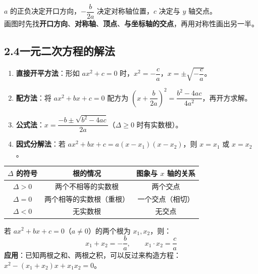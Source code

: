 \documentclass[12pt, a4paper]{ctexart}
\begin{document}
\begin{tipbox}[二次函数图象速记]
$a$ 的正负决定开口方向，$-\dfrac{b}{2a}$ 决定对称轴位置，$c$ 决定与 $y$ 轴交点。\\
画图时先找\textbf{开口方向}、\textbf{对称轴}、\textbf{顶点}、\textbf{与坐标轴的交点}，再用对称性画出另一半。
\end{tipbox}

\subsection*{2.4\quad 一元二次方程的解法}

\begin{knowledgebox}[一元二次方程 $ax^2 + bx + c = 0$ 的解法]
\begin{enumerate}[leftmargin=2em]
  \item \textbf{直接开平方法}：形如 $ax^2 + c = 0$ 时，$x^2 = -\dfrac{c}{a}$，$x = \pm\sqrt{-\dfrac{c}{a}}$。
  \item \textbf{配方法}：将 $ax^2 + bx + c = 0$ 配方为 $\left(x + \dfrac{b}{2a}\right)^2 = \dfrac{b^2 - 4ac}{4a^2}$，再开方求解。
  \item \textbf{公式法}：$x = \dfrac{-b \pm \sqrt{b^2 - 4ac}}{2a}$（$\Delta \geq 0$ 时有实数根）。
  \item \textbf{因式分解法}：若 $ax^2 + bx + c = a(x - x_1)(x - x_2)$，则 $x = x_1$ 或 $x = x_2$。
\end{enumerate}
\end{knowledgebox}

\begin{knowledgebox}[判别式 $\Delta = b^2 - 4ac$ 的作用]
\begin{center}
\renewcommand{\arraystretch}{1.3}
\begin{tabular}{c|c|c}
\toprule
$\Delta$ 的符号 & 根的情况 & 图象与 $x$ 轴的关系 \\
\midrule
$\Delta > 0$ & 两个不相等的实数根 & 两个交点 \\
$\Delta = 0$ & 两个相等的实数根（重根） & 一个交点（相切） \\
$\Delta < 0$ & 无实数根 & 无交点 \\
\bottomrule
\end{tabular}
\end{center}
\end{knowledgebox}

\begin{knowledgebox}
若 $ax^2 + bx + c = 0$（$a \neq 0$）的两个根为 $x_1, x_2$，则：
\[
  x_1 + x_2 = -\frac{b}{a}, \qquad x_1 \cdot x_2 = \frac{c}{a}
\]
\textbf{应用}：已知两根之和、两根之积，可以反过来构造方程：$x^2 - (x_1+x_2)x + x_1 x_2 = 0$。
\end{knowledgebox}
\end{document}

